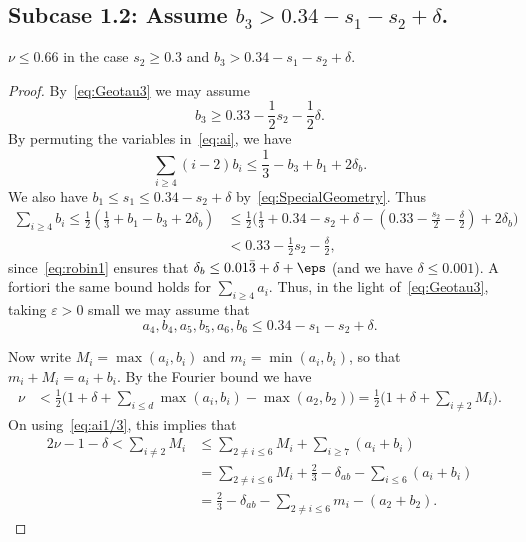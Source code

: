 \subsection*{Subcase 1.2: Assume $b_3> 0.34-s_1-s_2+\delta$.}
\begin{lemma}\label{lem:Subcase1.2}
  \leanok
  $\nu \leq 0.66$ in the case $s_2 \geq 0.3$ and $b_3 > 0.34-s_1-s_2+\delta$.
\end{lemma}
\begin{proof}
  \leanok
  By~\eqref{eq:Geotau3} we may assume
  \begin{equation}\label{eq:b3}
    b_3\geq 0.33 -\frac{1}{2}s_2-\frac{1}{2}\delta.
  \end{equation}
  By permuting the variables in~\eqref{eq:ai}, we have
  \[
  \sum_{i\ge4} (i-2)b_i\le\frac{1}{3}-b_3+b_1 + 2\delta_b.
  \]
  We also have
  $b_1\leq s_1\leq 0.34 -s_2+\delta$
  by~\eqref{eq:SpecialGeometry}.
  Thus
  \begin{align*}
    \sum_{i\geq 4}b_i \le \frac{1}{2}\left(\frac{1}{3}+b_1-b_3+2\delta_b\right)
    &\le \frac{1}{2}\Big(\frac{1}{3}+0.34
    -s_2+\delta
    -
    (0.33
    -\frac{s_2}{2}
    -\frac{\delta}{2})
    +2\delta_b\Big)\\ &< 0.33-\frac{1}{2}s_2-\frac{\delta}{2},
  \end{align*}
  since~\eqref{eq:robin1} ensures that $\delta_b\leq 0.01\bar 3+\delta+\eps$ (and we have $\delta\leq 0.001$).
  A fortiori the same bound holds for $\sum_{i\geq 4}a_i$.
  Thus, in the light of~\eqref{eq:Geotau3}, taking $\varepsilon>0$ small we may assume that
  \[
  a_4,b_4,a_5,b_5,a_6,b_6\leq 0.34-s_1-s_2+\delta.
  \]

  Now write $M_i = \max(a_i,b_i)$ and $m_i = \min(a_i,b_i)$, so that $m_i+M_i=a_i+b_i$.
  By the Fourier bound we have
  \begin{align*}
  \nu & < \frac{1}{2}\Big(1+\delta+ \sum_{i\leq d} \max(a_i,b_i) - \max(a_2,b_2)\Big) = \frac{1}{2}\Big(1 +\delta+ \sum_{i\neq 2}M_i\Big).
  \end{align*}
  On using~\eqref{eq:ai1/3},
  this implies that
  \begin{align*}
  2\nu -1-\delta < \sum_{i\neq 2} M_i &\le \sum_{2\neq i \le 6}M_i + \sum_{i\ge7} (a_i+b_i)\\
  &= \sum_{2\neq i \le 6}M_i + \frac{2}{3} -\delta_{ab} - \sum_{i\le 6}(a_i+b_i)\\
  &= \frac{2}{3} -\delta_{ab}-\sum_{2\neq i \le 6}m_i - (a_2+b_2).
  \end{align*}


\end{proof}
